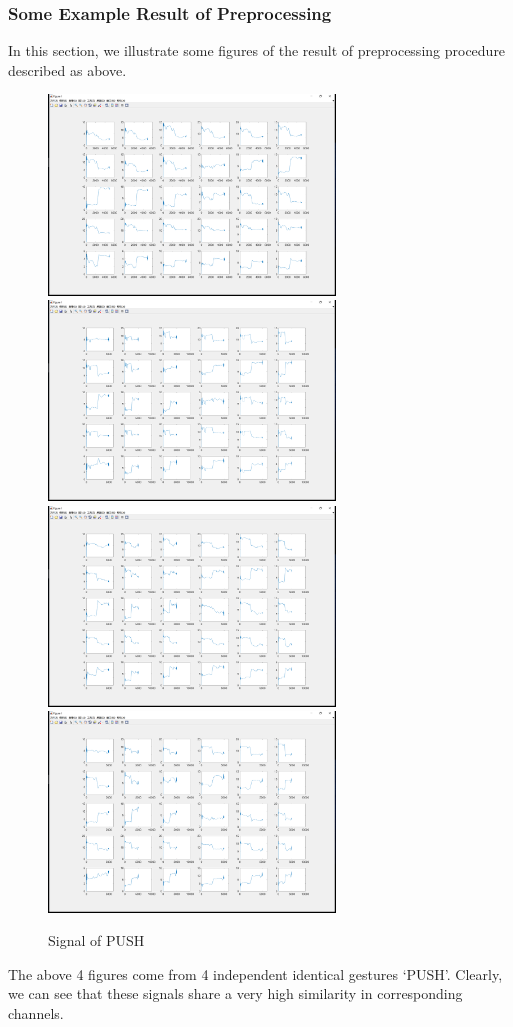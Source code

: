 \documentclass[conference]{IEEEtran}
\begin{document}
\subsubsection{Some Example Result of Preprocessing}
In this section, we illustrate some figures of the result of preprocessing procedure described as above.
\begin{figure}[H]
\centering
\includegraphics[width=3in]{PUSH1.png}
\includegraphics[width=3in]{PUSH2.png}
\includegraphics[width=3in]{PUSH3.png}
\includegraphics[width=3in]{PUSH4.png}
\caption{Signal of PUSH}
\end{figure}
The above 4 figures come from 4 independent identical gestures `PUSH'. Clearly, we can see that these signals share a very high similarity in corresponding channels.
\end{document}
